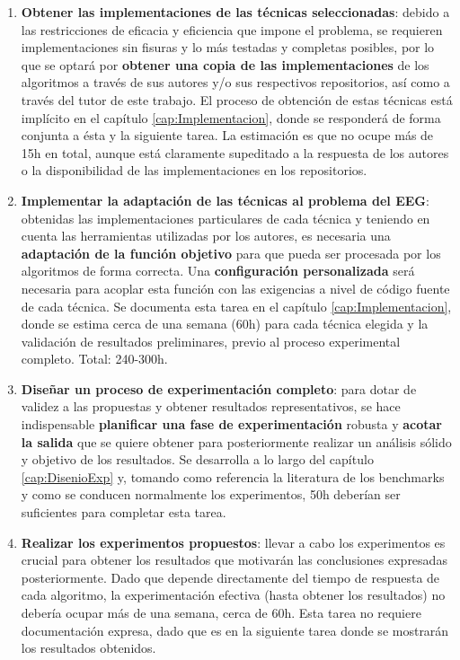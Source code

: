 \begin{enumerate}
	\item \label{tarea4-1} \textbf{Obtener las implementaciones de las técnicas seleccionadas}: debido a las restricciones de eficacia y eficiencia que impone el problema, se requieren implementaciones sin fisuras y lo más testadas y completas posibles, por lo que se optará por \textbf{obtener una copia de las implementaciones} de los algoritmos a través de sus autores y/o sus respectivos repositorios, así como a través del tutor de este trabajo. El proceso de obtención de estas técnicas está implícito en el capítulo \ref{cap:Implementacion}, donde se responderá de forma conjunta a ésta y la siguiente tarea. La estimación es que no ocupe más de 15h en total, aunque está claramente supeditado a la respuesta de los autores o la disponibilidad de las implementaciones en los repositorios. 
		
	\item \label{tarea5} \textbf{Implementar la adaptación de las técnicas al problema del EEG}: obtenidas las implementaciones particulares de cada técnica y teniendo en cuenta las herramientas utilizadas por los autores, es necesaria una \textbf{adaptación de la función objetivo} para que pueda ser procesada por los algoritmos de forma correcta. Una \textbf{configuración personalizada} será necesaria para acoplar esta función con las exigencias a nivel de código fuente de cada técnica. Se documenta esta tarea en el capítulo \ref{cap:Implementacion}, donde se estima cerca de una semana (60h) para cada técnica elegida y la validación de resultados preliminares, previo al proceso experimental completo. Total: 240-300h.
	
	\item  \label{tarea6}\textbf{Diseñar un proceso de experimentación completo}: para dotar de validez a las propuestas y obtener resultados representativos, se hace indispensable \textbf{planificar una fase de experimentación} robusta y \textbf{acotar la salida} que se quiere obtener para posteriormente realizar un análisis sólido y objetivo de los resultados. Se desarrolla a lo largo del capítulo \ref{cap:DisenioExp} y, tomando como referencia la literatura de los benchmarks y como se conducen normalmente los experimentos, 50h deberían ser suficientes para completar esta tarea.
	
	\item \label{tarea7} \textbf{Realizar los experimentos propuestos}: llevar a cabo los experimentos es crucial para obtener los resultados que motivarán las conclusiones expresadas posteriormente. Dado que depende directamente del tiempo de respuesta de cada algoritmo, la experimentación efectiva (hasta obtener los resultados) no debería ocupar más de una semana, cerca de 60h. Esta tarea no requiere documentación expresa, dado que es en la siguiente tarea donde se mostrarán los resultados obtenidos.
	

\end{enumerate}
